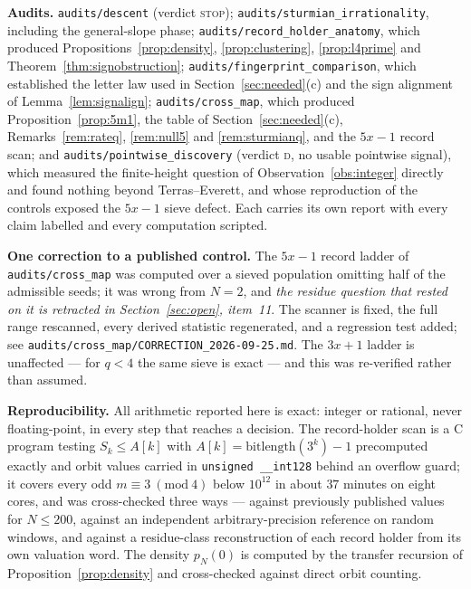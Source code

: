 \documentclass[11pt,reqno]{amsart}
\theoremstyle{plain}
\theoremstyle{definition}
\begin{document}
\medskip
\noindent\textbf{Audits.} \texttt{audits/descent} (verdict \textsc{stop});
\texttt{audits/sturmian\_irrationality}, including the general-slope phase;
\texttt{audits/record\_holder\_anatomy}, which produced
Propositions~\ref{prop:density}, \ref{prop:clustering}, \ref{prop:l4prime} and
Theorem~\ref{thm:signobstruction}; \texttt{audits/fingerprint\_comparison}, which
established the letter law used in Section~\ref{sec:needed}(c) and the sign
alignment of Lemma~\ref{lem:signalign}; \texttt{audits/cross\_map}, which
produced Proposition~\ref{prop:5m1}, the table of Section~\ref{sec:needed}(c),
Remarks~\ref{rem:rateq}, \ref{rem:null5} and \ref{rem:sturmianq}, and the $5x-1$
record scan; and \texttt{audits/pointwise\_discovery} (verdict \textsc{d}, no
usable pointwise signal), which measured the finite-height question of
Observation~\ref{obs:integer} directly and found nothing beyond
Terras--Everett, and whose reproduction of the controls exposed the $5x-1$ sieve
defect. Each carries its own report with every claim labelled and every
computation scripted.

\medskip
\noindent\textbf{One correction to a published control.} The $5x-1$ record ladder
of \texttt{audits/cross\_map} was computed over a sieved population omitting half
of the admissible seeds; it was wrong from $N=2$, and \emph{the residue question
that rested on it is retracted in Section~\ref{sec:open}, item~11}. The scanner is
fixed, the full range rescanned, every derived statistic regenerated, and a
regression test added; see \texttt{audits/cross\_map/CORRECTION\_2026-09-25.md}.
The $3x+1$ ladder is unaffected --- for $q<4$ the same sieve is exact --- and this
was re-verified rather than assumed.

\medskip
\noindent\textbf{Reproducibility.} All arithmetic reported here is exact: integer
or rational, never floating-point, in every step that reaches a decision. The
record-holder scan is a C program testing $S_k\le A[k]$ with
$A[k]=\mathrm{bitlength}(3^k)-1$ precomputed exactly and orbit values carried in
\texttt{unsigned \_\_int128} behind an overflow guard; it covers every odd
$m\equiv3\ (\mathrm{mod}\ 4)$ below $10^{12}$ in about $37$ minutes on eight
cores, and was cross-checked three ways --- against previously published values
for $N\le200$, against an independent arbitrary-precision reference on random
windows, and against a residue-class reconstruction of each record holder from its
own valuation word. The density $p_N(0)$ is computed by the transfer recursion of
Proposition~\ref{prop:density} and cross-checked against direct orbit counting.
\end{document}
